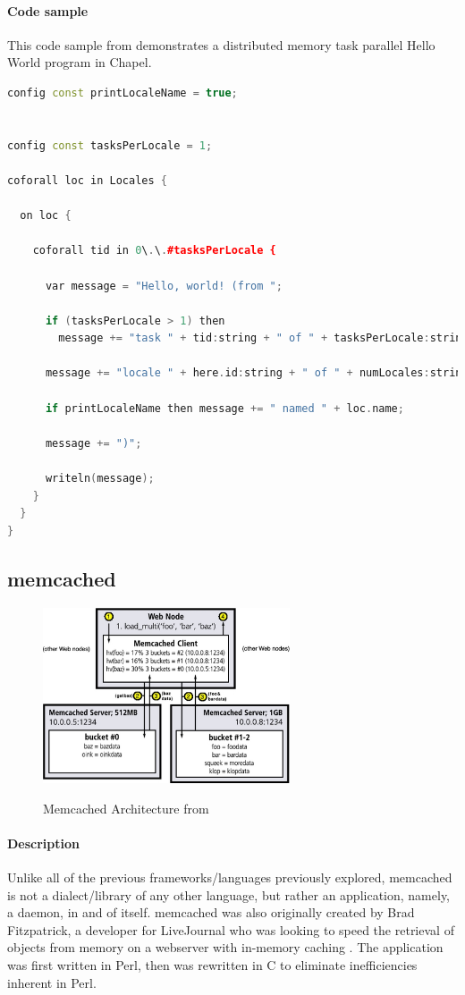 	\paragraph{Code sample}
	This code sample from \cite{chapel_github} demonstrates a distributed memory task parallel Hello World program in Chapel.
		
	\begin{lstlisting}[language=C++, caption=Hello World in Chapel, captionpos=b]
config const printLocaleName = true;


config const tasksPerLocale = 1;

coforall loc in Locales {

  on loc {

    coforall tid in 0\.\.#tasksPerLocale {

      var message = "Hello, world! (from ";

      if (tasksPerLocale > 1) then
        message += "task " + tid:string + " of " + tasksPerLocale:string + " on ";

      message += "locale " + here.id:string + " of " + numLocales:string;

      if printLocaleName then message += " named " + loc.name;

      message += ")";

      writeln(message);
    }
  }
}
	\end{lstlisting}

\subsection{memcached}
    \begin{figure}[h]
		\centering
		\includegraphics[width=0.65\textwidth]{Figures/memcached_arch.jpg}
		\label{fig:memcached_arch}
		\caption{Memcached Architecture from \cite{memcached_linux}}
    \end{figure}
	\paragraph{Description}
	Unlike all of the previous frameworks/languages previously explored, memcached is not a dialect/library of any other language, but rather an application, namely, a daemon, in and of itself. memcached was also originally created by Brad Fitzpatrick, a developer for LiveJournal who was looking to speed the retrieval of objects from memory on a webserver with in-memory caching \cite{lj_dev}. The application was first written in Perl, then was rewritten in C to eliminate inefficiencies inherent in Perl. 

